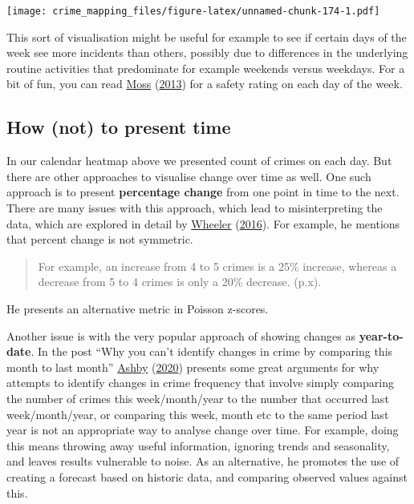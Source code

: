 \documentclass[
  krantz2]{krantz}
\begin{document}
\texttt{[image: crime\_mapping\_files/figure-latex/unnamed-chunk-174-1.pdf]}

This sort of visualisation might be useful for example to see if certain days of the week see more incidents than others, possibly due to differences in the underlying routine activities that predominate for example weekends versus weekdays. For a bit of fun, you can read \protect\hyperlink{ref-Moss_2013}{Moss} (\protect\hyperlink{ref-Moss_2013}{2013}) for a safety rating on each day of the week.

\hypertarget{how-not-to-present-time}{%
\subsection{How (not) to present time}\label{how-not-to-present-time}}

In our calendar heatmap above we presented count of crimes on each day. But there are other approaches to visualise change over time as well. One such approach is to present \textbf{percentage change} from one point in time to the next. There are many issues with this approach, which lead to misinterpreting the data, which are explored in detail by \protect\hyperlink{ref-Wheeler_2016}{Wheeler} (\protect\hyperlink{ref-Wheeler_2016}{2016}). For example, he mentions that percent change is not symmetric.

\begin{quote}
For example, an increase from 4 to 5 crimes is a 25\% increase, whereas a decrease from 5 to 4 crimes is only a 20\% decrease. (p.x).
\end{quote}

He presents an alternative metric in Poisson z-scores.

Another issue is with the very popular approach of showing changes as \textbf{year-to-date}. In the post ``Why you can't identify changes in crime by comparing this month to last month'' \protect\hyperlink{ref-Ashby_2020}{Ashby} (\protect\hyperlink{ref-Ashby_2020}{2020}) presents some great arguments for why attempts to identify changes in crime frequency that involve simply comparing the number of crimes this week/month/year to the number that occurred last week/month/year, or comparing this week, month etc to the same period last year is not an appropriate way to analyse change over time. For example, doing this means throwing away useful information, ignoring trends and seasonality, and leaves results vulnerable to noise. As an alternative, he promotes the use of creating a forecast based on historic data, and comparing observed values against this.
\end{document}
